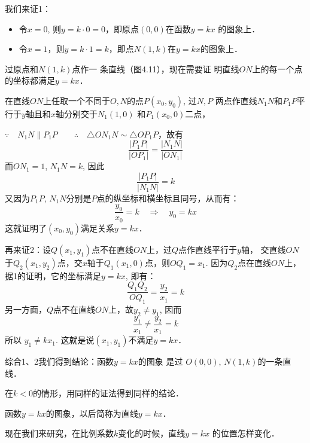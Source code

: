 我们来证1：
\begin{itemize}
    \item 令$x=0$, 则$y=k\cdot 0=0$，即原点$(0,0)$在函数$y=kx$
的图象上．
\item 令$x=1$，则$y=k\cdot 1=k$，即点$N(1,k)$在$y=kx$的图象上．
\end{itemize}

过原点和$N(1,k)$点作一
条直线（图4.11），现在需要证
明直线$ON$上的每一个点的坐标都满足$y=kx$．

\begin{figure}[htp]
    \centering
{}
    \caption{}
\end{figure}

在直线$ON$上任取一个不同于$O,N$的点$P(x_0,y_0)$, 过$N,P$
两点作直线$N_1N$和$P_1P$平行于$y$轴且和$x$轴分别交于$N_1(1,0)$
和$P_1(x_0,0)$二点，

$\because\quad N_1N\parallel P_1P\qquad \therefore\quad \triangle ON_1N\sim \triangle OP_1P$，故有
\[\frac{|P_1P|}{|OP_1|}=\frac{|N_1N|}{|ON_1|}\]
而$ON_1=1$, $N_1N=k$, 因此
\[\frac{|P_1P|}{|N_1N|}=k\]
又因为$P_1P$, $N_1N$分别是$P$点的纵坐标和横坐标且同号，从而有：
\[\frac{y_0}{x_0}=k\quad \Rightarrow\quad y_0=kx\]
这就证明了$(x_0,y_0)$满足关系$y=kx$．

再来证2：设$Q(x_1,y_1)$点不在直线$ON$上，过$Q$点作直线平行于$y$轴，
交直线$ON$于$Q_2(x_1,y_2)$点，交$x$轴于$Q_1(x_1,0)$点，则$OQ_1=
x_1$. 因为$Q_2$点在直线$ON$上，据1的证明，它的坐标满足$y=
kx$, 即有：
\[\frac{Q_1Q_2}{OQ_1}=\frac{y_2}{x_1}=k\]
另一方面，$Q$点不在直线$ON$上，故$y_2\ne y_1$, 因而
\[\frac{y_1}{x_1}\ne \frac{y_2}{x_1}=k\]
所以 $y_1\ne kx_1$. 这就是说$(x_1,y_1)$不满足$y=kx$．

综合1、2我们得到结论：函数$y=kx$的图象 是过
$O(0,0)$, $N(1,k)$的一条直线．

在$k<0$的情形，用同样的证法得到同样的结论．

函数$y=kx$的图象，以后简称为直线$y=kx$．

现在我们来研究，在比例系数$k$变化的时候，直线$y=kx$
的位置怎样变化．

